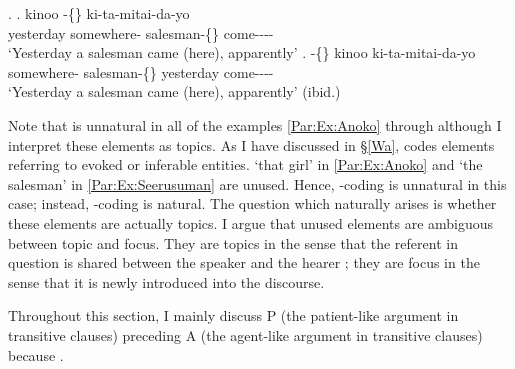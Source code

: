 \ex.
 \ag. kinoo  -\{\} ki-ta-mitai-da-yo \\
      yesterday somewhere- salesman-\{\} come---- \\
      `Yesterday a salesman came (here), apparently'
 \bg.  -\{\} kinoo ki-ta-mitai-da-yo \\
      somewhere- salesman-\{\} yesterday come---- \\
      `Yesterday a salesman came (here), apparently'
      \hfill{(ibid.)}

Note that  is unnatural in all of the examples \ref{Par:Ex:Anoko} through \Last
although I interpret these elements as topics.
As I have discussed in \S \ref{Wa},
 codes elements referring to evoked or inferable entities.
 `that girl' in \ref{Par:Ex:Anoko} and  `the salesman' in \ref{Par:Ex:Seerusuman} are unused.
Hence, -coding is unnatural in this case;
instead, -coding is natural.
The question which naturally arises is whether these elements are actually topics.
I argue that unused elements are ambiguous between topic and focus.
They are topics in the sense that the referent in question is shared between the speaker and the hearer ;
they are focus in the sense that it is newly introduced into the discourse.

Throughout this section,
I mainly discuss P (the patient-like argument in transitive clauses) preceding A (the agent-like argument in transitive clauses)
because .


